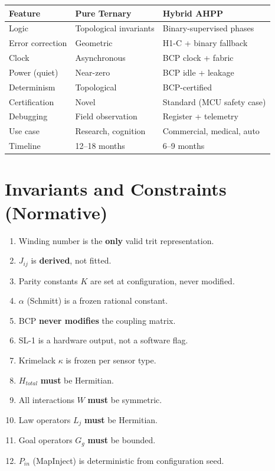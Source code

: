 \documentclass[11pt, a4paper]{report}
\begin{document}
\begin{center}
\begin{tabular}{@{}p{3.5cm}p{5cm}p{5cm}@{}}
\toprule
\textbf{Feature} & \textbf{Pure Ternary} & \textbf{Hybrid AHPP} \\
\midrule
Logic & Topological invariants & Binary-supervised phases \\
Error correction & Geometric & H1-C + binary fallback \\
Clock & Asynchronous & BCP clock + fabric \\
Power (quiet) & Near-zero & BCP idle + leakage \\
Determinism & Topological & BCP-certified \\
Certification & Novel & Standard (MCU safety case) \\
Debugging & Field observation & Register + telemetry \\
Use case & Research, cognition & Commercial, medical, auto \\
Timeline & 12--18 months & 6--9 months \\
\bottomrule
\end{tabular}
\end{center}

\chapter{Invariants and Constraints (Normative)}

\begin{enumerate}
  \item Winding number is the \textbf{only} valid trit representation.
  \item $J_{ij}$ is \textbf{derived}, not fitted.
  \item Parity constants $K$ are set at configuration, never modified.
  \item $\alpha$ (Schmitt) is a frozen rational constant.
  \item BCP \textbf{never modifies} the coupling matrix.
  \item SL-1 is a hardware output, not a software flag.
  \item Krimelack $\kappa$ is frozen per sensor type.
  \item $H_{total}$ \textbf{must} be Hermitian.
  \item All interactions $W$ \textbf{must} be symmetric.
  \item Law operators $L_j$ \textbf{must} be Hermitian.
  \item Goal operators $G_g$ \textbf{must} be bounded.
  \item $P_{in}$ (MapInject) is deterministic from configuration seed.
\end{enumerate}
\end{document}
